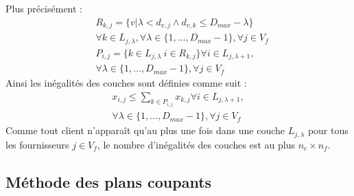 \documentclass[letterpaper]{article}
\begin{document}
Plus précisément :
\begin{align*}
&R_{k,j} = \{ v | \lambda < d_{v,j} \wedge d_{v,k}\leq D_{max}-\lambda \} \\ 
&\forall k \in L_{j,\lambda}, \forall \lambda \in \{ 1,...,D_{max}-1 \}, \forall j \in V_{f}\\
&P_{i,j} = \{ k \in L_{j,\lambda} \ i \in R_{k,j} \} \forall i \in L_{j,\lambda +1}, \\ 
&  \forall \lambda \in \{ 1,...,D_{max}-1 \}, \forall j \in V_{f}
\end{align*}
Ainsi les inégalités des couches sont définies comme suit : 
\begin{equation}\label{eq:layers}
\begin{aligned}
x_{i,j} \leq \sum_{k\in P_{i,j}}{x_{k,j}} \forall i \in L_{j,\lambda +1}, \\ \forall \lambda \in \{ 1,...,D_{max}-1 \}, \forall j \in V_{f}
\end{aligned}
\end{equation}
Comme tout client n'apparaît qu'au plus une fois dans une couche $L_{j,\lambda}$ pour tous les fournisseurs $j \in V_{f}$, le nombre d'inégalités des couches est au plus $n_{c}\times n_{f}$.
\subsection{Méthode des plans coupants}
\end{document}
